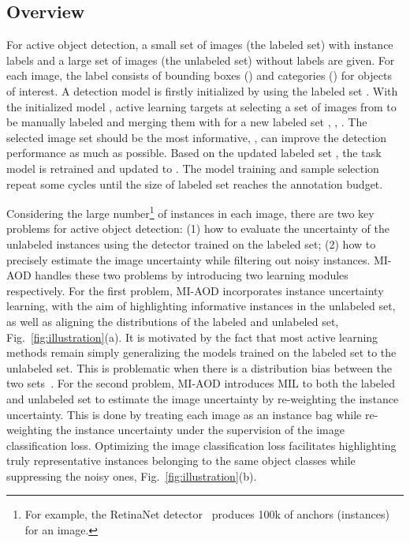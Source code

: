\documentclass[final]{cvpr}
\begin{document}
\subsection{Overview}
For active object detection, a small set of images  (the labeled set) with instance labels  and a large set of images  (the unlabeled set) without labels are given. For each image, the label consists of bounding boxes () and categories () for objects of interest. A detection model  is firstly initialized by using the labeled set . With the initialized model , active learning targets at selecting a set of images  from  to be manually labeled and merging them with  for a new labeled set , \ie, . The selected image set  should be the most informative, \ie, can improve the detection performance as much as possible. Based on the updated labeled set , the task model is retrained and updated to . The model training and sample selection repeat some cycles until the size of labeled set reaches the annotation budget. 

Considering the large number\footnote{For example, the RetinaNet detector~\cite{RetinaNet20} produces 100k of anchors (instances) for an image.} of instances in each image, there are two key problems for active object detection: (1) how to evaluate the uncertainty of the unlabeled instances using the detector trained on the labeled set; (2) how to precisely estimate the image uncertainty while filtering out noisy instances. MI-AOD handles these two problems by introducing two learning modules respectively. For the first problem, MI-AOD incorporates instance uncertainty learning, with the aim of highlighting informative instances in the unlabeled set, as well as aligning the distributions of the labeled and unlabeled set, Fig.~\ref{fig:illustration}(a). It is motivated by the fact that most active learning methods remain simply generalizing the models trained on the labeled set to the unlabeled set. This is problematic when there is a distribution bias between the two sets~\cite{SelfSupervised2020}. For the second problem, MI-AOD introduces MIL to both the labeled and unlabeled set to estimate the image uncertainty by re-weighting the instance uncertainty. This is done by treating each image as an instance bag while re-weighting the instance uncertainty under the supervision of the image classification loss. Optimizing the image classification loss facilitates highlighting truly representative instances belonging to the same object classes while suppressing the noisy ones, Fig.~\ref{fig:illustration}(b). 
\end{document}
